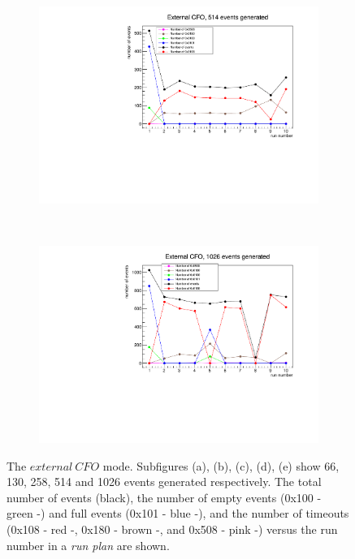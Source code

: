 \begin{figure}[!h]
\begin{subfigure}[t]{0.5\textwidth}
    \caption{}
\end{subfigure}%
~ 
\begin{subfigure}[t]{0.5\textwidth}
    \centering
    \includegraphics[width=1.1\textwidth]{figures/pdf/514.pdf}
    \caption{}
\end{subfigure}
~ 
\begin{subfigure}[t]{0.5\textwidth}
    \centering
    \includegraphics[width=1.1\textwidth]{figures/pdf/1026.pdf}
    \caption{}
\end{subfigure}
  \caption[The number of events versus run number (emulated CFO).]{The  $external \ CFO$ mode. Subfigures (a), (b), (c), (d), (e) show 66, 130, 258, 514 and 1026 events generated respectively. 
  The total number of events (black), the number of empty events (0x100 - green -) and full events (0x101 - blue -), 
  and the number of timeouts (0x108 - red -, 0x180 - brown -, and 0x508 - pink -) versus the run number in a \textit{run plan} are shown.}
  \label{fig:corruption}
\end{figure}



